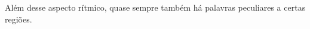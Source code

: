 Além desse aspecto rítmico, quase sempre também há palavras peculiares a certas
regiões. 

%
%
%
%
%
%
%
%
%
